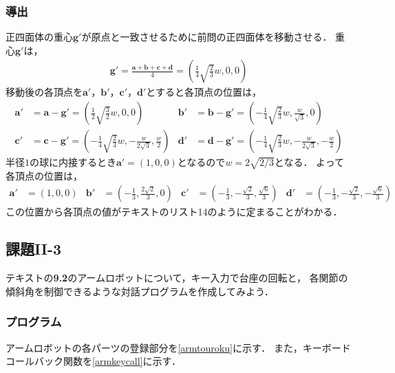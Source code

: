 \documentclass[]{jarticle}
\begin{document}
\subsubsection{導出}
正四面体の重心$\bm{g}'$が原点と一致させるために前問の正四面体を移動させる．
重心$\bm{g}'$は，
\begin{align*}
  \bm{g}' = \frac{\bm{a} + \bm{b} + \bm{c} + \bm{d}}{4}
  = \left(\frac{1}{4}\sqrt{\frac{2}{3}}w, 0, 0\right)
\end{align*}
移動後の各頂点を$\bm{a}'$，$\bm{b}'$，$\bm{c}'$，$\bm{d}'$とすると各頂点の位置は，
\begin{align*}
  \bm{a}'                                                                           & = \bm{a} - \bm{g}'
  = \left(\frac{1}{2}\sqrt{\frac{3}{2}}w, 0, 0\right)                               &
  \bm{b}'                                                                           & = \bm{b} - \bm{g}'
  = \left(-\frac{1}{4}\sqrt{\frac{2}{3}}w, \frac{w}{\sqrt{3}}, 0\right)                                  \\
  \bm{c}'                                                                           & = \bm{c} - \bm{g}'
  = \left(-\frac{1}{4}\sqrt{\frac{2}{3}}w, -\frac{w}{2\sqrt{3}}, \frac{w}{2}\right) &
  \bm{d}'                                                                           & = \bm{d} - \bm{g}'
  = \left(-\frac{1}{4}\sqrt{\frac{2}{3}}w, -\frac{w}{2\sqrt{3}}, -\frac{w}{2}\right)
\end{align*}
半径$1$の球に内接するとき$\bm{a}'=(1,0,0)$となるので$w=2\sqrt{2/3}$となる．
よって各頂点の位置は，
\begin{align*}
  \bm{a}' & = \left(1, 0, 0\right)                                                &
  \bm{b}' & = \left(-\frac{1}{3}, \frac{2\sqrt{2}}{3}, 0\right)                   &
  \bm{c}' & = \left(-\frac{1}{3}, -\frac{\sqrt{2}}{3}, \frac{\sqrt{6}}{3}\right)  &
  \bm{d}' & = \left(-\frac{1}{3}, -\frac{\sqrt{2}}{3}, -\frac{\sqrt{6}}{3}\right)
\end{align*}
この位置から各頂点の値がテキストのリスト14のように定まることがわかる．

\subsection{課題II-3}
テキストの\textbf{9.2}のアームロボットについて，キー入力で台座の回転と，
各関節の傾斜角を制御できるような対話プログラムを作成してみよう．
\subsubsection{プログラム}
アームロボットの各パーツの登録部分を\ref{armtouroku}に示す．
また，キーボードコールバック関数を\ref{armkeycall}に示す．
\end{document}
